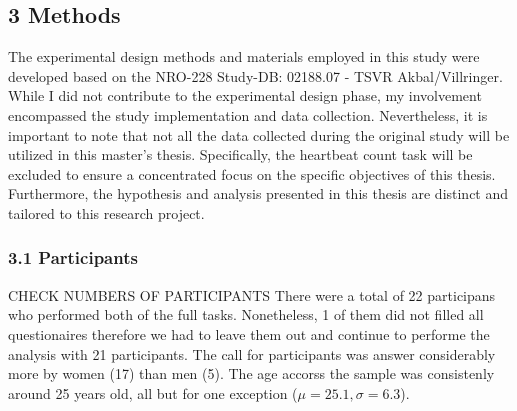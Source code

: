 \documentclass[12pt,oneside,openright]{report}
\begin{document}
\subsection*{3 Methods}
The experimental design methods and materials employed in this study were developed based on the NRO-228 Study-DB: 02188.07 - TSVR Akbal/Villringer. While I did not contribute to the experimental design phase, my involvement encompassed the study implementation and data collection. Nevertheless, it is important to note that not all the data collected during the original study will be utilized in this master's thesis. Specifically, the heartbeat count task will be excluded to ensure a concentrated focus on the specific objectives of this thesis. Furthermore, the hypothesis and analysis presented in this thesis are distinct and tailored to this research project.

\subsubsection*{3.1 Participants}
CHECK NUMBERS OF PARTICIPANTS There were a total of 22 participans who performed both of the full tasks. Nonetheless, 1 of them did not filled all questionaires therefore we had to leave them out and continue to performe the analysis with 21 participants. The call for participants was answer considerably more by women (17) than men (5). The age accorss the sample was consistenly around 25 years old, all but for one exception ($\mu=25.1 , \sigma=6.3$).
\end{document}

